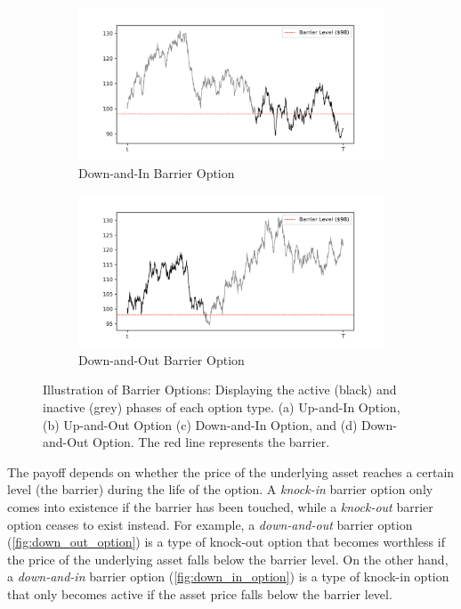 \documentclass[a4paper]{report}
\begin{document}
\begin{figure}[H]
    \medskip
    \begin{subfigure}{.5\linewidth}
      \includegraphics[width=\linewidth]{images/down_in_option.png}
      \caption{Down-and-In Barrier Option}
      \label{fig:down_in_option}
    \end{subfigure}\hfill
    \begin{subfigure}{.5\linewidth}
      \includegraphics[width=\linewidth]{images/down_out_option.png}
      \caption{Down-and-Out Barrier Option}
      \label{fig:down_out_option}
    \end{subfigure}
    
    \caption{Illustration of Barrier Options: Displaying the active (black) and inactive (grey) phases of each option type. (a) Up-and-In Option, (b) Up-and-Out Option (c) Down-and-In Option, and (d) Down-and-Out Option. The red line represents the barrier.}
\end{figure}

The payoff depends on whether the price of the underlying asset reaches a certain level (the barrier) during the life of the option. A \textit{knock-in} barrier option only comes into existence if the barrier has been touched, while a \textit{knock-out} barrier option ceases to exist instead. For example, a \textit{down-and-out} barrier option (\autoref{fig:down_out_option}) is a type of knock-out option that becomes worthless if the price of the underlying asset falls below the barrier level. On the other hand, a \textit{down-and-in} barrier option (\autoref{fig:down_in_option}) is a type of knock-in option that only becomes active if the asset price falls below the barrier level.
\end{document}
